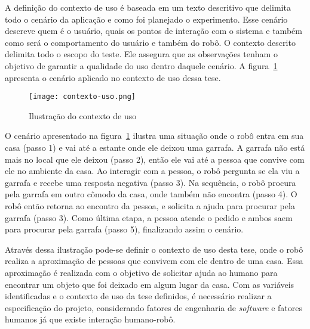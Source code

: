 A definição do contexto de uso é baseada em um texto descritivo que delimita todo o cenário da aplicação e como foi planejado o experimento. Esse cenário descreve quem é o usuário, quais os pontos de interação com o sistema e também como será o comportamento do usuário e também do robô. O contexto descrito delimita todo o escopo do teste. Ele assegura que as observações tenham o objetivo de garantir a qualidade do uso dentro daquele cenário. A figura~\ref{fig:contextouso} apresenta o cenário aplicado no contexto de uso dessa tese.

\begin{figure}[ht!]
	\centering
	\begin{minipage}{\textwidth}
		\caption{Ilustração do contexto de uso}
		\texttt{[image: contexto-uso.png]}
		\label{fig:contextouso}
	\end{minipage}
\end{figure}

O cenário apresentado na figura~\ref{fig:contextouso} ilustra uma situação onde o robô entra em sua casa (passo 1) e vai até a estante onde ele deixou uma garrafa. A garrafa não está mais no local que ele deixou (passo 2), então ele vai até a pessoa que convive com ele no ambiente da casa. Ao interagir com a pessoa, o robô pergunta se ela viu a garrafa e recebe uma resposta negativa (passo 3). Na sequência, o robô procura pela garrafa em outro cômodo da casa, onde também não encontra (passo 4). O robô então retorna ao encontro da pessoa, e solicita a ajuda para procurar pela garrafa (passo 3). Como última etapa, a pessoa atende o pedido e ambos saem para procurar pela garrafa (passo 5), finalizando assim o cenário.

Através dessa ilustração pode-se definir o contexto de uso desta tese, onde o robô realiza a aproximação de pessoas que convivem com ele dentro de uma casa. Essa aproximação é realizada com o objetivo de solicitar ajuda ao humano para encontrar um objeto que foi deixado em algum lugar da casa. Com as variáveis identificadas e o contexto de uso da tese definidos, é necessário realizar a especificação do projeto, considerando fatores de engenharia de \emph{software} e fatores humanos já que existe interação humano-robô.

